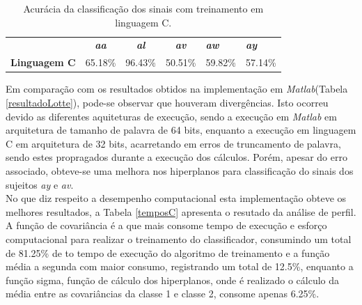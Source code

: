 \begin{table}[!h]
	\centering
	\caption{Acurácia da classificação dos sinais com treinamento em linguagem C.}
	\label{acuraciaC}
	
	\begin{tabular}{lcccll}
		\rowcolor[HTML]{DAE8FC} 
		\multicolumn{1}{c}{\cellcolor[HTML]{DAE8FC}\textbf{Sistema}} & \textit{\textbf{aa}}        & \textit{\textbf{al}}        & \textit{\textbf{av}}        & \textit{\textbf{aw}} & \textit{\textbf{ay}} \\
		\textbf{Linguagem C}                                        & \multicolumn{1}{r}{65.18\%} & \multicolumn{1}{r}{96.43\%} & \multicolumn{1}{r}{50.51\%} & 59.82\%              & 57.14\%             
	\end{tabular}
\end{table}

Em comparação com os resultados obtidos na implementação em \textit{Matlab}(Tabela \ref{resultadoLotte}), pode-se observar que houveram divergências. Isto ocorreu devido as diferentes aquiteturas de execução, sendo a execução em \textit{Matlab} em arquitetura de tamanho de palavra de 64 bits, enquanto a execução em linguagem C em arquitetura de 32 bits, acarretando em erros de truncamento de palavra, sendo estes propragados durante a execução dos cálculos. Porém, apesar do erro associado, obteve-se uma melhora nos hiperplanos para classificação do sinais dos sujeitos \textit{ay} e \textit{av}.\\

No que diz respeito a desempenho computacional esta implementação obteve os melhores resultados, a Tabela \ref{temposC} apresenta o resutado da análise de perfil. A função de covariância é a que mais consome tempo de execução e esforço computacional para realizar o treinamento do classificador, consumindo um total de 81.25\% de to tempo de execução do algoritmo de treinamento e a função média a segunda com maior consumo, registrando um total de 12.5\%, enquanto a função sigma, função de cálculo dos hiperplanos, onde é realizado o cálculo da média entre as covariâncias da classe 1 e classe 2, consome apenas 6.25\%.\\


